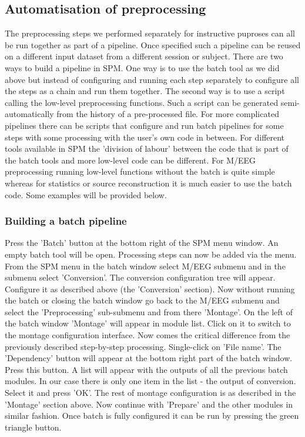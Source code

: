 \subsection{Automatisation of preprocessing}
The preprocessing steps we performed separately for instructive puproses can all be run together as part of a pipeline. Once specified such a pipeline can be reused on a different input dataset from a different session or subject. There are two ways to build a pipeline in SPM. One way is to use the batch tool as we did above but instead of configuring and running each step separately to configure all the steps as a chain and run them together. The second way is to use a script calling the low-level preprocessing functions. Such a script can be generated semi-automatically from the history of a pre-processed file. For more complicated pipelines there can be scripts that configure and run batch pipelines for some steps with some processing with the user's own code in between. For different tools available in SPM the 'division of labour' between the code that is part of the batch tools and more low-level code can be different. For M/EEG preprocessing running low-level functions without the batch is quite simple whereas for statistics or source reconstruction it is much easier to use the batch code. Some examples will be provided below.

\subsubsection{Building a batch pipeline}
Press the 'Batch' button at the bottom right of the SPM menu window.  An empty batch tool will be open. Processing steps can now be added via the menu. From the SPM menu in the batch window select M/EEG submenu and in the submenu select 'Conversion'. The conversion configuration tree will appear. Configure it as described above (the 'Conversion' section).  Now without running the batch or closing the batch window go back to the M/EEG submenu and select the 'Preprocessing' sub-submenu and from there 'Montage'.  On the left of the batch window 'Montage' will appear in module list.  Click on it to switch to the montage configuration interface.  Now comes the critical difference from the previously described step-by-step processing. Single-click on 'File name'. The 'Dependency' button will appear at the bottom right part of the batch window. Press this button. A list will appear with the outputs of all the previous batch modules. In our case there is only one item in the list - the output of conversion. Select it and press 'OK'. The rest of montage configuration is as described in the 'Montage' section above. Now continue with 'Prepare' and the other modules in similar fashion. Once batch is fully configured it can be run by pressing the green triangle button.

